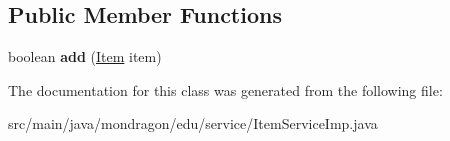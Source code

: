 \subsection*{Public Member Functions}
\begin{DoxyCompactItemize}
\item 
\mbox{\label{classmondragon_1_1edu_1_1service_1_1_item_service_imp_aff4597b7519b36da077a5306b03d7c7c}} 
boolean {\bfseries add} (\mbox{\hyperlink{classmondragon_1_1edu_1_1clases_1_1_item}{Item}} item)
\end{DoxyCompactItemize}


The documentation for this class was generated from the following file\+:\begin{DoxyCompactItemize}
\item 
src/main/java/mondragon/edu/service/Item\+Service\+Imp.\+java\end{DoxyCompactItemize}
